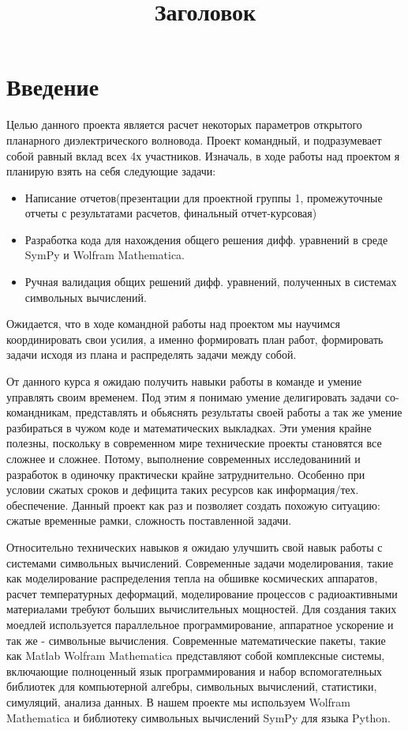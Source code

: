 \documentclass{article}
\title{Заголовок}
\begin{document}
\tableofcontents

\newpage

\section{Введение}

Целью данного проекта является расчет некоторых параметров открытого планарного диэлектрического волновода.
Проект командный, и подразумевает собой равный вклад всех 4х участников. Изначаль, в ходе работы над проектом я планирую взять на себя следующие задачи:
\begin{itemize}
    \item Написание отчетов(презентации для проектной группы 1, промежуточные отчеты с результатами расчетов, финальный отчет-курсовая)
    \item Разработка кода для нахождения общего решения дифф. уравнений в среде SymPy и Wolfram Mathematica.
    \item Ручная валидация общих решений дифф. уравнений, полученных в системах символьных вычислений.
\end{itemize}

Ожидается, что в ходе командной работы над проектом мы научимся координировать свои усилия, а именно формировать план работ, формировать задачи исходя из плана и распределять задачи между собой.\\[10pt]\par
От данного курса я ожидаю получить навыки работы в команде и умение управлять своим временем. Под этим я понимаю умение делигировать задачи со-командникам, представлять и обьяснять результаты своей работы а так же умение разбираться в чужом коде и математических выкладках. Эти умения крайне полезны, поскольку в современном мире технические проекты становятся все сложнее и сложнее. Потому, выполнение современных исследованиний и разработок в одиночку практически крайне затруднительно. Особенно при условии сжатых сроков и дефицита таких ресурсов как информация/тех. обеспечение. Данный проект как раз и позволяет создать похожую ситуацию: сжатые временные рамки, сложность поставленной задачи.\\[10pt] \par
Относительно технических навыков я ожидаю улучшить свой навык работы с системами символьных вычислений. Современные задачи моделирования, такие как моделирование распределения тепла на обшивке космических аппаратов, расчет температурных деформаций, моделирование процессов с радиоактивными материалами требуют больших вычислительных мощностей. Для создания таких моедлей используется параллельное программирование, аппаратное ускорение и так же - символьные вычисления. Современные математические пакеты, такие как Matlab  Wolfram Mathematica представляют собой комплексные системы, включающие полноценный язык программирования и набор вспомогателньых библиотек для компьютерной алгебры, символьных вычислений, статистики, симуляций, анализа данных. В нашем проекте мы используем Wolfram Mathematica и библиотеку символьных вычислений SymPy для языка Python. 
\newpage
\end{document}
